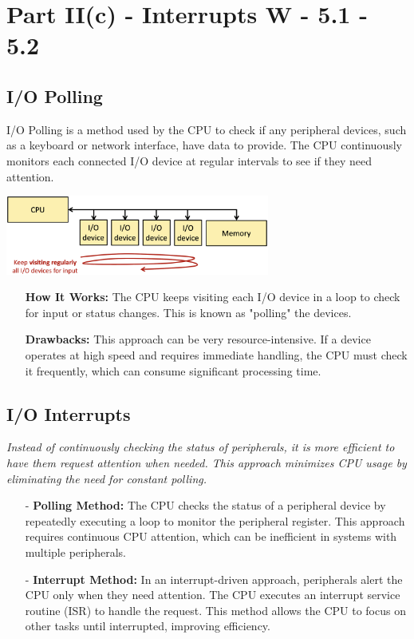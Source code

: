 \chapter{Part II(c) - Interrupts W - 5.1 - 5.2}

\section{I/O Polling}

I/O Polling is a method used by the CPU to check if any peripheral devices, such as a keyboard or network interface, have data to provide. The CPU continuously monitors each connected I/O device at regular intervals to see if they need attention.
\begin{center}
    \includegraphics[width=0.65\textwidth]{chapters/chapter2c/images/IOP.png}
\end{center}
\begin{itemize}
    \item[] \textbf{How It Works:} The CPU keeps visiting each I/O device in a loop to check for input or status changes. This is known as "polling" the devices.
    \item[] \textbf{Drawbacks:} This approach can be very resource-intensive. If a device operates at high speed and requires immediate handling, the CPU must check it frequently, which can consume significant processing time.
\end{itemize}

\section{I/O Interrupts}
\textit{Instead of continuously checking the status of peripherals, it is more efficient to have them \textit{request attention} when needed. This approach minimizes CPU usage by eliminating the need for constant polling.}
\begin{itemize}
    \item[-] \textbf{Polling Method:} The CPU checks the status of a peripheral device by repeatedly executing a loop to monitor the peripheral register. This approach requires continuous CPU attention, which can be inefficient in systems with multiple peripherals. \\
    \item[-] \textbf{Interrupt Method:} In an interrupt-driven approach, peripherals alert the CPU only when they need attention. The CPU executes an interrupt service routine (ISR) to handle the request. This method allows the CPU to focus on other tasks until interrupted, improving efficiency.
\end{itemize}

